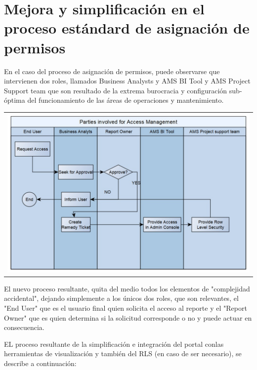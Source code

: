 
\section{Mejora y simplificación en el proceso estándard de asignación de permisos}

En el caso del proceso de asignación de permisos, puede observarse que intervienen dos roles, llamados Business Analysts y AMS BI Tool y AMS Project Support team que son resultado de la extrema burocracia y configuración sub-óptima del funcionamiento de las áreas de operaciones y mantenimiento.
\vspace{1cm}

\begin{tabular}{l}
\includegraphics[width=15cm]{Workflow-aprobacion-original.jpeg}
\end{tabular}

El nuevo proceso resultante, quita del medio todos los elementos de "complejidad accidental", dejando simplemente a los únicos dos roles, que son relevantes, el "End User" que es el usuario final quien solicita el acceso al reporte y el "Report Owner" que es quien determina si la solicitud corresponde o no y puede actuar en consecuencia.

EL proceso resultante de la simplificación e integración del portal conlas herramientas de visualización y también del RLS (en caso de ser necesario), se describe a continuación:

